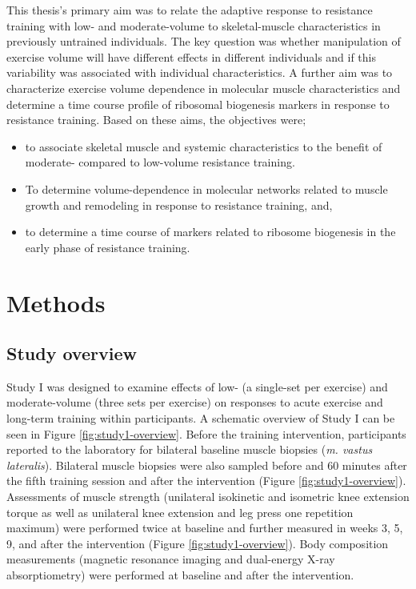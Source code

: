 \documentclass[twoside,10pt]{gihclass} %
\providecommand{\tightlist}{%
  \setlength{\itemsep}{0pt}\setlength{\parskip}{0pt}}
\begin{document}
This thesis's primary aim was to relate the adaptive response to resistance training with low- and moderate-volume to skeletal-muscle characteristics in previously untrained individuals. The key question was whether manipulation of exercise volume will have different effects in different individuals and if this variability was associated with individual characteristics. A further aim was to characterize exercise volume dependence in molecular muscle characteristics and determine a time course profile of ribosomal biogenesis markers in response to resistance training. Based on these aims, the objectives were;
\begin{itemize}
\tightlist
\item
  to associate skeletal muscle and systemic characteristics to the benefit of moderate- compared to low-volume resistance training.
\item
  To determine volume-dependence in molecular networks related to muscle growth and remodeling in response to resistance training, and,
\item
  to determine a time course of markers related to ribosome biogenesis in the early phase of resistance training.
\end{itemize}
\hypertarget{methods}{%
\chapter{Methods}\label{methods}}

\hypertarget{study-overview}{%
\section{Study overview}\label{study-overview}}

Study I was designed to examine effects of low- (a single-set per exercise) and moderate-volume (three sets per exercise) on responses to acute exercise and long-term training within participants.
A schematic overview of Study I can be seen in Figure \ref{fig:study1-overview}.
Before the training intervention, participants reported to the laboratory for bilateral baseline muscle biopsies (\emph{m. vastus lateralis}).
Bilateral muscle biopsies were also sampled before and 60 minutes after the fifth training session and after the intervention (Figure \ref{fig:study1-overview}).
Assessments of muscle strength (unilateral isokinetic and isometric knee extension torque as well as unilateral knee extension and leg press one repetition maximum) were performed twice at baseline and further measured in weeks 3, 5, 9, and after the intervention (Figure \ref{fig:study1-overview}).
Body composition measurements (magnetic resonance imaging and dual-energy X-ray absorptiometry) were performed at baseline and after the intervention.
\end{document}
